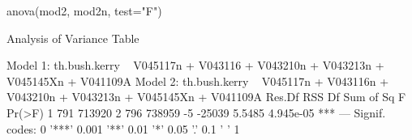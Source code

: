 \begin{Schunk}
\begin{Sinput}
 anova(mod2, mod2n, test="F")
\end{Sinput}
\begin{Soutput}
Analysis of Variance Table

Model 1: th.bush.kerry ~ V045117n + V043116 + V043210n + V043213n + V045145Xn + 
    V041109A
Model 2: th.bush.kerry ~ V045117n + V043116n + V043210n + V043213n + V045145Xn + 
    V041109A
  Res.Df    RSS Df Sum of Sq      F    Pr(>F)    
1    791 713920                                  
2    796 738959 -5    -25039 5.5485 4.945e-05 ***
---
Signif. codes:  0 '***' 0.001 '**' 0.01 '*' 0.05 '.' 0.1 ' ' 1
\end{Soutput}
\end{Schunk}
